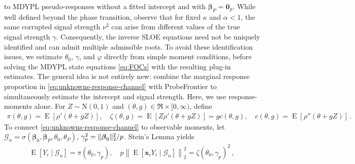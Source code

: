 \documentclass{article}
\makeatletter
\DeclareMathOperator{\expect}{E}
\theoremstyle{definition}
\newcommand{\vnorm}[1]{%
	\ensuremath{%
		\if@display
		\left\| #1 \right\|
		\else
		\| #1 \|
		\fi
	}%
}
\newcommand*{\bb}{\boldsymbol}
\def\bx{\bb{x}}
\def\bbeta{\bb{\beta}}
\makeatother
\begin{document}
\begin{bibunit}
to MDYPL pseudo-responses without a fitted intercept and with
$\bbeta_P=\bb 0_p$.
While well defined beyond the phase transition, \citet[Figure~8]{sterzinger+kosmidis:2026} observe that
for fixed $\kappa$ and $\alpha<1$, the same
corrupted signal strength $\nu^2$ can arise from different values of
the true signal strength $\gamma$. Consequently, the inverse SLOE equations
need not be uniquely identified and can admit multiple admissible roots.
To avoid these identification issues, we estimate $\theta_0$, $\gamma$, and $\varphi$ directly from simple moment 
conditions, before solving the MDYPL state equations \eqref{eq:FOCs} with the resulting plug-in estimates. 
The general idea is not entirely new: \citet[Section~7.2]{zhao+etal:2022} combine the marginal response proportion in \eqref{eq:unknowns-response-channel}
with ProbeFrontier to simultaneously estimate the intercept and signal strength. Here, we use response-moments alone.
For $Z\sim\mathrm N(0,1)$ and $(\theta,g)\in\Re\times[0,\infty)$, define
\begin{equation}
\label{eq:unknowns-response-channel}
\begin{aligned}
    \pi(\theta,g)
    =
    \expect[\rho'(\theta+gZ)], \quad
    \zeta(\theta,g)
    =
    \expect[Z\rho'(\theta+gZ)]
    =
    g c(\theta, g), \quad c(\theta, g) = \expect[\rho''(\theta + g Z)] 
    \,.
\end{aligned}
\end{equation}
To connect \eqref{eq:unknowns-response-channel} to observable moments, let
$\mathcal G_n=\sigma(\bbeta_0,\bbeta_P,\theta_0,\theta_P)$,
$\gamma_p^2=\vnorm{\bbeta_0}_2^2/p$. 
Stein's Lemma \citep[Lemma~1]{stein:1981} yields
\begin{equation}
\label{eq:unknowns-response-population-moments}
\begin{aligned}
    \expect[Y_i\mid\mathcal G_n]
    =
    \pi(\theta_0,\gamma_p), \quad
    p\left\|
        \expect[\bx_iY_i\mid\mathcal G_n]
    \right\|_2^2
    =
    \zeta(\theta_0,\gamma_p)^2 \,, 
\end{aligned}
\end{equation}

\end{bibunit}
\end{document}
